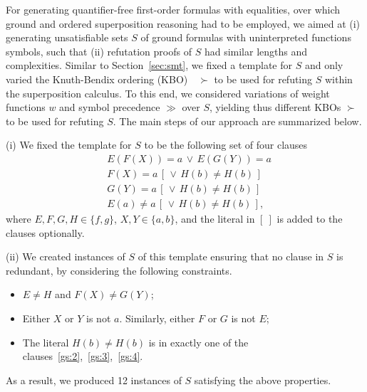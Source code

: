 For generating quantifier-free first-order formulas with equalities,
over which ground and ordered superposition reasoning had to be employed, we
aimed at (i)  generating  unsatisfiable sets $S$ of ground formulas with
uninterpreted functions symbols, such that (ii)  refutation proofs
of $S$ had similar lengths and complexities. Similar to
Section~\ref{sec:smt}, we fixed a template for $S$  and only varied
the Knuth-Bendix ordering (KBO)~\cite{Knuth1970}~$\succ$ to be used for refuting  $S$
within the superposition calculus. To this end, we considered
variations of weight functions $w$ and symbol precedence $\gg$ over $S$,
yielding thus different KBOs $\succ$ to be used for refuting $S$.
The main steps of our approach are summarized below.\smallskip

\noindent(i) We fixed the template for $S$ to be the following set of four clauses
\begin{align}
  &E(F(X)) = a \,\lor\, E(G(Y)) = a \label{gs:1} \\
  &F(X) = a \,[\, \lor\, H(b) \not= H(b) \,] \label{gs:2} \\
  &G(Y) = a \,[\, \lor\, H(b) \not= H(b) \,] \label{gs:3} \\
  &E(a) \not= a \,[\, \lor\, H(b) \not= H(b) \,] \label{gs:4},
\end{align}
where $E, F, G, H \in \{f, g\}$, $X, Y \in \{a, b\}$, and the literal
in $[~]$ is added to the clauses optionally.\smallskip


\noindent(ii)
We created
instances of $S$ of this template ensuring that no clause in $S$ is
redundant, by considering the following constraints.
\begin{itemize}
  \item $E \not = H$ and $F(X) \not = G(Y)$;
  \item Either $X$ or $Y$ is not $a$. Similarly, either $F$ or $G$ is not $E$;
  \item The literal $H(b) \not = H(b)$ is in exactly one of the
    clauses~\eqref{gs:2},~\eqref{gs:3},~\eqref{gs:4}.
\end{itemize}
As a result, we produced 12 instances of $S$ satisfying the above properties.\smallskip
%


